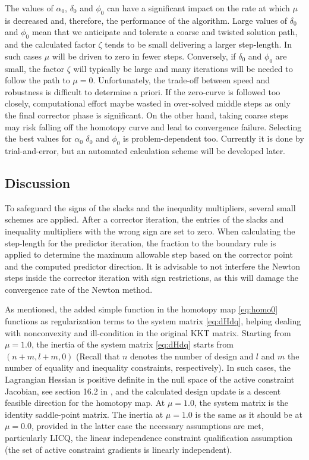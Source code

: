 \documentclass{article}
\theoremstyle{definition}
\begin{document}
The values of $\alpha_0$, $\delta_0$ and $\phi_0$ can have a significant impact on the rate at which $\mu$ is decreased and, therefore, the performance of the algorithm. Large values of $\delta_0$ and $\phi_0$ mean that we anticipate and tolerate a coarse and twisted solution path, and the calculated factor $\zeta$ tends to be small delivering a larger step-length. In such cases $\mu$ will be driven to zero in fewer steps.  Conversely, if $\delta_0$ and $\phi_0$ are small, the factor $\zeta$ will typically be large and many iterations will be needed to follow the path to $\mu = 0$. Unfortunately, the trade-off between speed and robustness is difficult to determine a priori. If the zero-curve is followed too closely, computational effort maybe wasted in over-solved middle steps as only the final corrector phase is significant. On the other hand, taking coarse steps may risk falling off the homotopy curve and lead to convergence failure. Selecting the best values for $\alpha_0$ $\delta_0$ and $\phi_0$ is problem-dependent too. Currently it is done by trial-and-error, but an automated calculation scheme will be developed later.

\subsection{Discussion}
To safeguard the signs of the slacks and the inequality multipliers, several small schemes are applied. After a corrector iteration, the entries of the slacks and inequality multipliers with the wrong sign are set to zero. When calculating the step-length for the predictor iteration, the fraction to the boundary rule is applied to determine the maximum allowable step based on the corrector point and the computed predictor direction. It is advisable to not interfere the Newton steps inside the corrector iteration with sign restrictions, as this will damage the convergence rate of the Newton method.  

As mentioned, the added simple function in the homotopy map \eqref{eq:homo0} functions as regularization terms to the system matrix \eqref{eq:dHdq}, helping dealing with nonconvexity and ill-condition in the original KKT matrix. Starting from $\mu = 1.0$, the inertia of the system matrix \eqref{eq:dHdq} starts from $(n+m, l+m, 0)$ (Recall that $n$ denotes the number of design and $l$ and $m$ the number of equality and inequality constraints, respectively). In such cases, the Lagrangian Hessian is positive definite in the null space of the active constraint Jacobian, see section 16.2 in \cite{Nocedal2006NO}, and the calculated design update is a descent feasible direction for the homotopy map. At $\mu = 1.0$, the system matrix is the identity saddle-point matrix. The inertia at $\mu = 1.0 $ is the same as it should be at $\mu=0.0$, provided in the latter case the necessary assumptions are met, particularly LICQ, the linear independence constraint qualification assumption (the set of active constraint gradients is linearly independent). 
\end{document}
